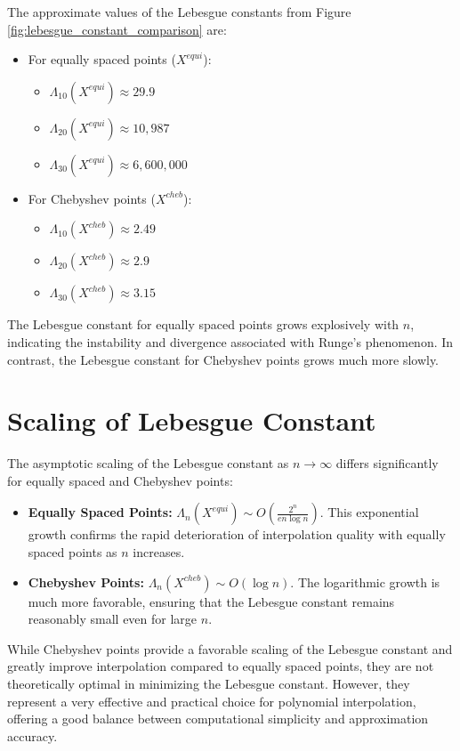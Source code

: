 \documentclass{article}
\begin{document}
The approximate values of the Lebesgue constants from Figure \ref{fig:lebesgue_constant_comparison} are:
\begin{itemize}
    \item For equally spaced points ($X^{equi}$):
    \begin{itemize}
        \item $\Lambda_{10}(X^{equi}) \approx 29.9$
        \item $\Lambda_{20}(X^{equi}) \approx 10,987$
        \item $\Lambda_{30}(X^{equi}) \approx 6,600,000$
    \end{itemize}
    \item For Chebyshev points ($X^{cheb}$):
    \begin{itemize}
        \item $\Lambda_{10}(X^{cheb}) \approx 2.49$
        \item $\Lambda_{20}(X^{cheb}) \approx 2.9$
        \item $\Lambda_{30}(X^{cheb}) \approx 3.15$
    \end{itemize}
\end{itemize}
The Lebesgue constant for equally spaced points grows explosively with $n$, indicating the instability and divergence associated with Runge's phenomenon. In contrast, the Lebesgue constant for Chebyshev points grows much more slowly.

\section{Scaling of Lebesgue Constant}

The asymptotic scaling of the Lebesgue constant as $n \to \infty$ differs significantly for equally spaced and Chebyshev points:

\begin{itemize}
    \item \textbf{Equally Spaced Points:} $\Lambda_n(X^{equi}) \sim O\left(\frac{2^n}{e n \log n}\right)$. This exponential growth confirms the rapid deterioration of interpolation quality with equally spaced points as $n$ increases.
    \item \textbf{Chebyshev Points:} $\Lambda_n(X^{cheb}) \sim O(\log n)$.  The logarithmic growth is much more favorable, ensuring that the Lebesgue constant remains reasonably small even for large $n$.
\end{itemize}

While Chebyshev points provide a favorable scaling of the Lebesgue constant and greatly improve interpolation compared to equally spaced points, they are not theoretically optimal in minimizing the Lebesgue constant. However, they represent a very effective and practical choice for polynomial interpolation, offering a good balance between computational simplicity and approximation accuracy.
\end{document}
